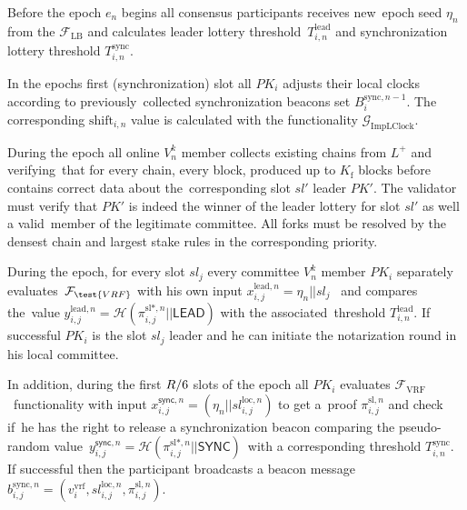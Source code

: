 \begin{legal}
    \item Before the epoch $e_n$ begins all consensus participants receives new\
    epoch seed $\eta_n$ from the ${\mathcal{F}}_{\text{LB}}$ and calculates leader lottery threshold\
    $T_{i, n}^{\text{lead}}$ and synchronization lottery threshold $T_{i, n}^{\text{sync}}$.

    \item In the epochs first (synchronization) slot all $PK_i$ adjusts their local clocks according to previously\
    collected synchronization beacons set $B_i^{\text{sync}, n - 1}$.
    The corresponding $\text{shift}_{i, n}$ value is calculated with the functionality $\mathcal{G}_{\text{ImpLClock}}$.

    \item During the epoch all online $V^k_n$ member collects existing chains from $L^+$ and verifying\
    that for every chain, every block, produced up to $K_{\text{f}}$ blocks before contains correct data about the\
    corresponding slot $sl'$ leader $PK'$.
    The validator must verify that $PK'$ is indeed the winner of the leader lottery for slot $sl'$ as well a valid\
    member of the legitimate committee.
    All forks must be resolved by the densest chain and largest stake rules in the corresponding priority.

    \item During the epoch, for every slot $sl_j$ every committee $V^k_n$ member $PK_i$ separately evaluates\
    ${\mathcal{F}}_{\test{VRF}}$ with his own input ${x_{i, j}^{\text{lead}, n} = \eta_n || sl_j}$ \ and compares the\
    value ${y_{i, j}^{\text{lead}, n} = \mathcal{H}(\pi_{i, j}^{\text{sl}*, n}||\textsf{LEAD})}$ with the associated\
    threshold $T_{i, n}^{\text{lead}}$.
    If successful $PK_i$ is the slot $sl_j$ leader and he can initiate the notarization round in his local committee.

    In addition, during the first $R\//6$ slots of the epoch all $PK_i$ evaluates $\mathcal{F}_{\text{VRF}}$\
    functionality with input ${x_{i, j}^{\textsf{sync}, n} = (\eta_n || sl_{i, j}^{\text{loc}, n})}$ to get a\
    proof $\pi_{i, j}^{\text{sl}, n}$ and check if\
    he has the right to release a synchronization beacon comparing the pseudo-random value\
    ${y_{i, j}^{\textsf{sync}, n} = \mathcal{H}(\pi_{i, j}^{\text{sl}*, n} || \textsf{SYNC})}$\
    with a corresponding threshold $T_{i, n}^{\text{sync}}$.
    If successful then the participant broadcasts a beacon message\
    $b_{i, j}^{\text{sync}, n} = (v^{\text{vrf}}_i, sl_{i, j}^{\text{loc}, n}, \pi_{i, j}^{\text{sl}, n})$.


\end{legal}
